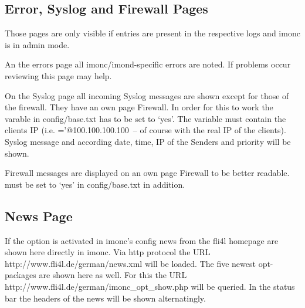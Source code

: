   \subsection{Error, Syslog and Firewall Pages}

  Those pages are only visible if entries are present in the respective logs and imonc
  is in admin mode.

  An the errors page all imonc/imond-specific errors are noted. If problems occur
  reviewing this page may help.

  On the Syslog page all incoming Syslog messages are shown except for those of the
  firewall. They have an own page Firewall. In order for this to work the varable
   in config/base.txt has to be set to `yes'. The variable
   must contain the clients IP 
  (i.e. ='@100.100.100.100~-- of course with the real IP
  of the clients).  Syslog message and according date, time, IP of the Senders
  and priority will be shown.

  Firewall messages are displayed on an own page Firewall to be better readable.
   must be set to `yes' in config/base.txt in addition.

  \subsection{News Page}

  If the option is activated in imonc's config news from the fli4l homepage are
  shown here directly in imonc. Via http protocol the
  URL http://www.fli4l.de/german/news.xml will be loaded. The five newest opt-packages
  are shown here as well. For this the URL http://www.fli4l.de/german/imonc\_opt\_show.php
  will be queried. In the status bar the headers of the news will be shown alternatingly.
